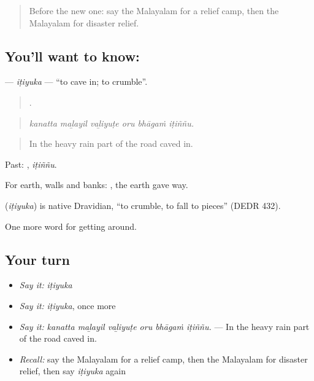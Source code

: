 \label{lesson:ML-C513-itiyuka}



\begin{quote}
Before the new one: say the Malayalam for a relief camp, then the Malayalam for disaster relief.
\end{quote}

\subsection*{You'll want to know: }
\textbf{} — \emph{iṭiyuka} — \textquotedblleft{}to cave in; to crumble\textquotedblright{}.

\begin{quote}
     .
\end{quote}

\begin{quote}
\emph{kanatta maḻayil vaḻiyuṭe oru bhāgaṁ iṭiññu.}
\end{quote}

\begin{quote}
In the heavy rain part of the road caved in.
\end{quote}

Past: , \emph{iṭiññu}.

For earth, walls and banks:  , the earth gave way.

\begin{cousinweb}
\textbf{} (\emph{iṭiyuka}) is native Dravidian, \textquotedblleft{}to crumble, to fall to pieces\textquotedblright{} (DEDR 432).
\end{cousinweb}

\begin{grammarlens}[title={What you've built}]
One more word for getting around.
\end{grammarlens}

\subsection*{Your turn}
\begin{itemize}
\raggedright
  \item \emph{Say it:} \emph{iṭiyuka}
  \item \emph{Say it:} \emph{iṭiyuka}, once more
  \item \emph{Say it:} \emph{kanatta maḻayil vaḻiyuṭe oru bhāgaṁ iṭiññu.} — In the heavy rain part of the road caved in.
  \item \emph{Recall:} say the Malayalam for a relief camp, then the Malayalam for disaster relief, then say \emph{iṭiyuka} again
\end{itemize}

